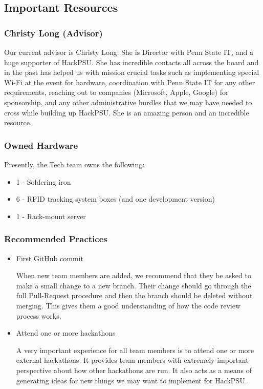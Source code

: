 \documentclass[twoside, 12pt]{article}
\newenvironment{tightitemize} %
{\begin{itemize}\itemsep1pt \parskip0pt \parsep0pt}
{\end{itemize}\vspace{-\topsep}}
\begin{document}
\subsection{Important Resources}
\subsubsection{Christy Long (Advisor)}
\par Our current advisor is Christy Long. She is Director with Penn State IT, and a huge supporter of HackPSU. She has incredible contacts all across the board and in the past has helped us with mission crucial tasks such as implementing special Wi-Fi at the event for hardware, coordination with Penn State IT for any other requirements, reaching out to companies (Microsoft, Apple, Google) for sponsorship, and any other administrative hurdles that we may have needed to cross while building up HackPSU. She is an amazing person and an incredible resource.
\subsubsection{Owned Hardware}
\par Presently, the Tech team owns the following:
\begin{tightitemize}
    \item 1 - Soldering iron
    \item 6 - RFID tracking system boxes (and one development version)
    \item 1 - Rack-mount server
\end{tightitemize}
\subsubsection{Recommended Practices}
\par 
\begin{tightitemize}
    \item First GitHub commit
    \par When new team members are added, we recommend that they be asked to make a small change to a new branch. Their change should go through the full Pull-Request procedure and then the branch should be deleted without merging. This gives them a good understanding of how the code review process works.
    \item Attend one or more hackathons
    \par A very important experience for all team members is to attend one or more external hackathons. It provides team members with extremely important perspective about how other hackathons are run. It also acts as a means of generating ideas for new things we may want to implement for HackPSU.
\end{tightitemize}
\end{document}
